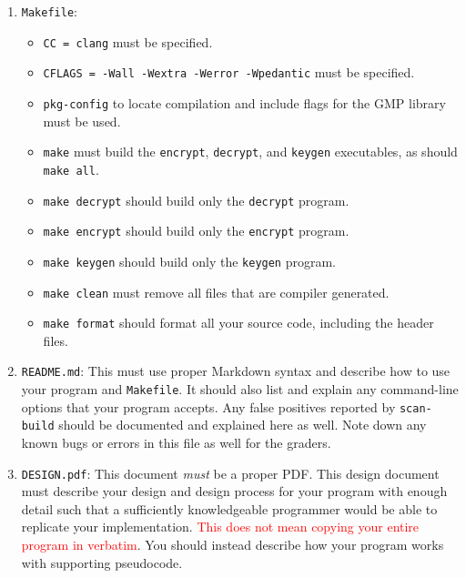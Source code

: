\begin{enumerate}
  \item \texttt{Makefile}:
    \begin{itemize}
      \item \texttt{CC = clang} must be specified.

      \item \texttt{CFLAGS = -Wall -Wextra -Werror -Wpedantic} must be specified.

      \item \texttt{pkg-config} to locate compilation and include flags
        for the GMP library must be used.

      \item \texttt{make} must build the \texttt{encrypt},
        \texttt{decrypt}, and \texttt{keygen}
        executables, as should \texttt{make all}.

      \item \texttt{make decrypt} should build only the \texttt{decrypt}
        program.

      \item \texttt{make encrypt} should build only the \texttt{encrypt}
        program.

      \item \texttt{make keygen} should build only the \texttt{keygen}
        program.

      \item \texttt{make clean} must remove all files that are compiler
        generated.

      \item \texttt{make format} should format all your source code,
        including the header files.
    \end{itemize}

  \item \texttt{README.md}: This must use proper Markdown syntax and
    describe how to use your program and \texttt{Makefile}. It should
    also list and explain any command-line options that your program
    accepts. Any false positives reported by \texttt{scan-build} should
    be documented and explained here as well. Note down any known bugs
    or errors in this file as well for the graders.

  \item \texttt{DESIGN.pdf}: This document \emph{must} be a proper
    PDF\@. This design document must describe your design and design
    process for your program with enough detail such that a sufficiently
    knowledgeable programmer would be able to replicate your
    implementation. \textcolor{red}{This does not mean copying your
    entire program in verbatim}. You should instead describe how your
    program works with supporting pseudocode.


\end{enumerate}
